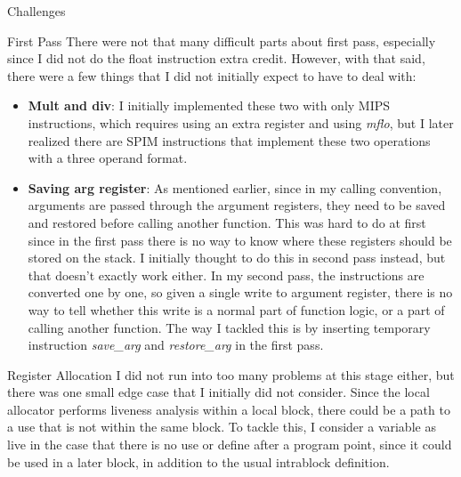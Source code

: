 \documentclass[letterpaper,12pt]{article}
\theoremstyle{definition}
\begin{document}
    \begin{section}{Challenges}
        \begin{subsection}{First Pass}
            There were not that many difficult parts about first pass, especially since I did not do the float instruction extra credit. However, with that said, there were a few things that I did not initially expect to have to deal with:
            \begin{itemize}
                \item \textbf{Mult and div}: I initially implemented these two with only MIPS instructions, which requires using an extra register and using \textit{mflo}, but I later realized there are SPIM instructions that implement these two operations with a three operand format.
                \item \textbf{Saving arg register}: As mentioned earlier, since in my calling convention, arguments are passed through the argument registers, they need to be saved and restored before calling another function. This was hard to do at first since in the first pass there is no way to know where these registers should be stored on the stack. I initially thought to do this in second pass instead, but that doesn't exactly work either. In my second pass, the instructions are converted one by one, so given a single write to argument register, there is no way to tell whether this write is a normal part of function logic, or a part of calling another function. The way I tackled this is by inserting temporary instruction \textit{save\_arg} and \textit{restore\_arg} in the first pass.
            \end{itemize}
        \end{subsection}

        \begin{subsection}{Register Allocation}
            I did not run into too many problems at this stage either, but there was one small edge case that I initially did not consider. Since the local allocator performs liveness analysis within a local block, there could be a path to a use that is not within the same block. To tackle this, I consider a variable as live in the case that there is no use or define after a program point, since it could be used in a later block, in addition to the usual intrablock definition.
        \end{subsection}


\end{section}
\end{document}
